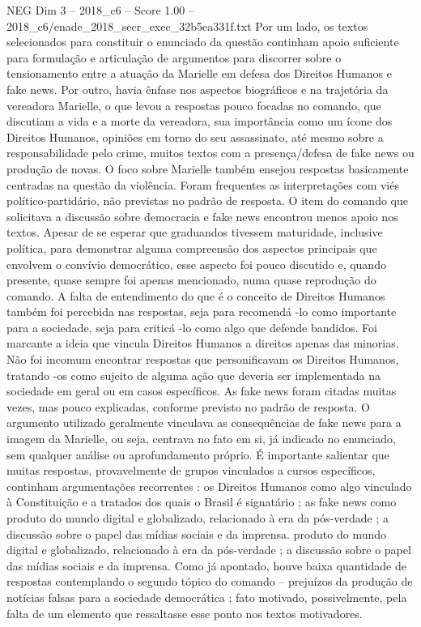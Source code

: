 \begin{textsample}{NEG Dim 3 – 2018\_c6 – Score 1.00 – 2018\_c6/enade\_2018\_secr\_exec\_32b5ea331f.txt}
Por um lado, os textos selecionados para constituir o enunciado da questão continham apoio suficiente para formulação e articulação de argumentos para discorrer sobre o tensionamento entre a atuação da Marielle em defesa dos Direitos Humanos e fake news.
Por outro, havia ênfase nos aspectos biográficos e na trajetória da vereadora Marielle, o que levou a respostas pouco focadas no comando, que discutiam a vida e a morte da vereadora, sua importância como um ícone dos Direitos Humanos, opiniões em torno do seu assassinato, até mesmo sobre a responsabilidade pelo crime, muitos textos com a presença/defesa de fake news ou produção de novas.
O foco sobre Marielle também ensejou respostas basicamente centradas na questão da violência.
Foram frequentes as interpretações com viés político-partidário, não previstas no padrão de resposta.
O item do comando que solicitava a discussão sobre democracia e fake news encontrou menos apoio nos textos.
Apesar de se esperar que graduandos tivessem maturidade, inclusive política, para demonstrar alguma compreensão dos aspectos principais que envolvem o convívio democrático, esse aspecto foi pouco discutido e, quando presente, quase sempre foi apenas mencionado, numa quase reprodução do comando.
A falta de entendimento do que é o conceito de Direitos Humanos também foi percebida nas respostas, seja para recomendá -lo como importante para a sociedade, seja para criticá -lo como algo que defende bandidos.
Foi marcante a ideia que vincula Direitos Humanos a direitos apenas das minorias.
Não foi incomum encontrar respostas que personificavam os Direitos Humanos, tratando -os como sujeito de alguma ação que deveria ser implementada na sociedade em geral ou em casos específicos.
As fake news foram citadas muitas vezes, mas pouco explicadas, conforme previsto no padrão de resposta.
O argumento utilizado geralmente vinculava as consequências de fake news para a imagem da Marielle, ou seja, centrava no fato em si, já indicado no enunciado, sem qualquer análise ou aprofundamento próprio.
É importante salientar que muitas respostas, provavelmente de grupos vinculados a cursos específicos, continham argumentações recorrentes : os Direitos Humanos como algo vinculado à Constituição e a tratados dos quais o Brasil é signatário ; as fake news como produto do mundo digital e globalizado, relacionado à era da pós-verdade ; a discussão sobre o papel das mídias sociais e da imprensa. produto do mundo digital e globalizado, relacionado à era da pós-verdade ; a discussão sobre o papel das mídias sociais e da imprensa.
Como já apontado, houve baixa quantidade de respostas contemplando o segundo tópico do comando – prejuízos da produção de notícias falsas para a sociedade democrática ; fato motivado, possivelmente, pela falta de um elemento que ressaltasse esse ponto nos textos motivadores.

\end{textsample}
